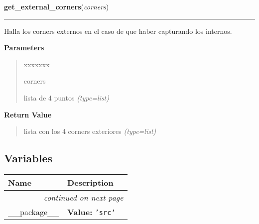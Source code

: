 \hspace{.8\funcindent}\begin{boxedminipage}{\funcwidth}

    \raggedright \textbf{get\_external\_corners}(\textit{corners})

    \vspace{-1.5ex}

    \rule{\textwidth}{0.5\fboxrule}
\setlength{\parskip}{2ex}
Halla los corners externos en el caso de que haber capturando los internos.

\setlength{\parskip}{1ex}
      \textbf{Parameters}
      \vspace{-1ex}

      \begin{quote}
        \begin{Ventry}{xxxxxxx}

          \item[corners]


lista de 4 puntos
            {\it (type=list)}

        \end{Ventry}

      \end{quote}

      \textbf{Return Value}
    \vspace{-1ex}

      \begin{quote}

lista con los 4 corners exteriores
      {\it (type=list)}

      \end{quote}

    \end{boxedminipage}



  \subsection{Variables}

    \vspace{-1cm}
\hspace{\varindent}\begin{longtable}{|p{\varnamewidth}|p{\vardescrwidth}|l}
\cline{1-2}
\cline{1-2} \centering \textbf{Name} & \centering \textbf{Description}& \\
\cline{1-2}
\endhead\cline{1-2}\multicolumn{3}{r}{\small\textit{continued on next page}}\\\endfoot\cline{1-2}
\endlastfoot\raggedright \_\-\_\-p\-a\-c\-k\-a\-g\-e\-\_\-\_\- & \raggedright \textbf{Value:} 
{\tt \texttt{'}\texttt{src}\texttt{'}}&\\
\cline{1-2}
\end{longtable}

